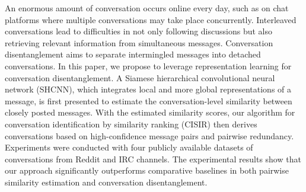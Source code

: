 An enormous amount of conversation occurs online every day, such as on chat platforms where multiple conversations may take place concurrently. Interleaved conversations lead to difficulties in not only following discussions but also retrieving relevant information from simultaneous messages. Conversation disentanglement aims to separate intermingled messages into detached conversations. In this paper, we propose to leverage representation learning for conversation disentanglement. A Siamese hierarchical convolutional neural network (SHCNN), which integrates local and more global representations of a message, is first presented to estimate the conversation-level similarity between closely posted messages. With the estimated similarity scores, our algorithm for  conversation identification by similarity ranking (CISIR) then derives conversations based on high-confidence message pairs and pairwise redundancy. Experiments were conducted with four publicly available datasets of conversations from Reddit and IRC channels. The experimental results show that our approach significantly outperforms comparative baselines in both pairwise similarity estimation and conversation disentanglement.
